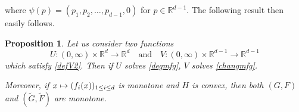 \documentclass[JEP,XML,SOM,Unicode,NoEqCountersInSection,published]{cedram}
\newcommand\mto{\mathchoice{\longmapsto}{\mapsto}{\mapsto}{\mapsto}}
\newtheorem{Prop}{Proposition}[section]
\theoremstyle{definition}
\begin{document}
where $\psi(p) = (p_1,p_2,\dots,p_{d-1},0)$ for $p \in \mathbb{R}^{d-1}$. The following result then easily follows.
\begin{Prop}
Let us consider two functions
\[
U: (0,\infty) \times \mathbb{R}^d \to \mathbb{R}^d\quad\text{and}\quad V: (0,\infty)\times \mathbb{R}^{d-1} \to \mathbb{R}^{d-1}
\]
which satisfy \eqref{defV2}. Then if $U$ solves \eqref{degmfg}, $V$ solves \eqref{changmfg}.

Moreover, if $x \mto (f_i(x))_{1\leq i \leq d}$ is monotone and $H$ is convex, then both $(G,F)$ and $(\tilde{G},\tilde{F})$ are monotone.
\end{Prop}




\end{document}
